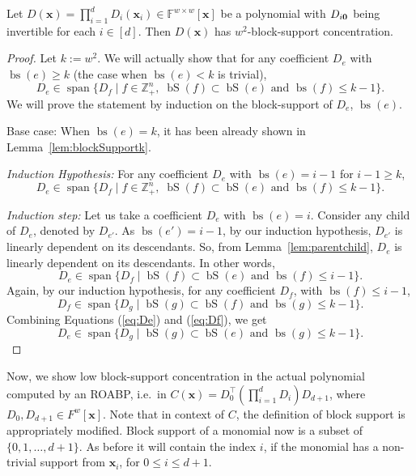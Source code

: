 \documentclass[final,oneeqnum, onethmnum, onefignum]{siamltex1213}
\newcommand{\Zp}{\mathbb{Z}_+}
\newcommand{\F}{\mathbb F}
\newcommand{\Dx}{D(\mathbf{x})}
\DeclareMathOperator{\Span}{span}
\DeclareMathOperator{\bs}{bs}
\DeclareMathOperator{\bS}{bS}
\newcommand{\x}{\mathbf{x}}
\begin{document}
\begin{lemma}
\label{lem:bSConc}
Let $\Dx = \prod_{i=1}^{d} D_i (\mathbf{x}_i) \in \F^{w \times w}[\mathbf{x}]$
 be a polynomial
with $D_{i\bf{0}}$ being invertible for each $i \in [d]$.
Then $\Dx$ has $w^2$-block-support concentration. 
\end{lemma} 
\begin{proof}
Let $k:= w^2$. We will actually show that
for any coefficient $D_e$ with $\bs(e) \geq k$ (the case when $\bs(e) < k$ is trivial), 
$$D_e \in \Span\{ D_f \mid f \in \Zp^n, \; \bS(f) \subset \bS(e) \text{ and } \bs(f) \leq k-1 \}.$$
We will prove the statement by induction on
the block-support of $D_e$, $\bs(e)$.

{Base case:} When $\bs(e)=k$, it has been already shown in 
Lemma~\ref{lem:blockSupportk}.

{\em Induction Hypothesis:} For any coefficient $D_e$
with $\bs(e) = i-1$ for $i-1 \geq k$, 
$$D_e \in \Span\{ D_f \mid f \in \Zp^n, \; \bS(f) \subset \bS(e) \text{ and } \bs(f) \leq k-1 \}.$$

{\em Induction step:}
Let us take a coefficient $D_e$ with $\bs(e) = i$. 
Consider any child of $D_e$, denoted by $D_{e'}$. 
As $\bs(e')=i-1$, by our induction hypothesis, 
$D_{e'}$ is linearly dependent on its descendants. 
So, from Lemma~\ref{lem:parentchild}, 
$D_{e}$ is linearly dependent on its descendants. 
In other words, 
\begin{equation}
D_e \in \Span\{ D_f \mid \bS(f) \subset \bS(e) \text{ and } \bs(f) \leq i-1 \}.
\label{eq:De}
\end{equation}
Again, by our induction hypothesis, for any coefficient $D_f$, 
with $\bs(f) \leq i-1$, 
\begin{equation}
D_f \in \Span\{ D_g \mid \bS(g) \subset \bS(f) \text{ and } \bs(g) \leq k-1 \}.
\label{eq:Df}
\end{equation}
Combining Equations (\ref{eq:De}) and (\ref{eq:Df}),
we get
$$D_e \in \Span\{ D_g \mid \bS(g) \subset \bS(e) \text{ and } \bs(g) \leq k-1 \}.$$
\end{proof}

Now, we show low block-support concentration in
the actual polynomial computed by an ROABP, i.e.\
in $C(\mathbf{x}) = D_0^{\top} (\prod_{i=1}^d D_i) D_{d+1}$, 
where $D_0,D_{d+1} \in F^w[\mathbf{x}]$.
Note that in context of $C$, the definition of block support
is appropriately modified. Block support of a monomial now
is a subset of $\{0,1, \dots, d+1\}$. As before it will contain
the index $i$, if the monomial has a non-trivial support from $\x_i$,
for $0 \leq i \leq d+1$.
\end{document}
